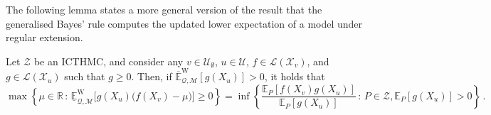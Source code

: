 \documentclass[twoside,11pt]{article}
\newcommand{\reals}{\mathbb{R}}
\newcommand{\states}{\mathcal{X}}
\newcommand{\lexp}{\underline{\mathbb{E}}_{\rateset,\mathcal{M}}^\mathrm{W}}
\newcommand{\uexp}{\overline{\mathbb{E}}_{\rateset,\mathcal{M}}^\mathrm{W}}
\newcommand{\gambles}{\mathcal{L}}
\newcommand{\rateset}{\mathcal{Q}}
\begin{document}
The following lemma states a more general version of the result that the generalised Bayes' rule computes the updated lower expectation of a model under regular extension.

\begin{lemma}\label{lemma:general_regular_extension}
Let $\mathcal{Z}$ be an ICTHMC, and consider any $v\in\mathcal{U}_\emptyset$, $u\in\mathcal{U}$, $f\in\gambles(\states_v)$, and $g\in\gambles(\states_u)$ such that $g\geq 0$. Then, if $\uexp[g(X_u)]>0$, it holds that
\begin{equation*}
\max\left\{\mu\in\reals\,:\, \lexp\bigl[g(X_u)\bigl(f(X_v) - \mu\bigr)\bigr] \geq 0\right\} = \inf\left\{ \frac{\mathbb{E}_P[f(X_v)g(X_u)]}{\mathbb{E}_P[g(X_u)]}\,:\,P\in\mathcal{Z}, \mathbb{E}_P[g(X_u)]>0 \right\}\,.
\end{equation*}
\end{lemma}
\end{document}
